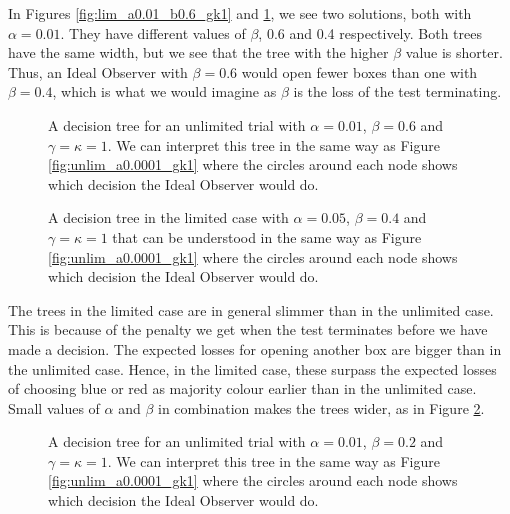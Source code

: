In Figures \ref{fig:lim_a0.01_b0.6_gk1} and \ref{fig:lim_a0.01_b0.4_gk1}, we see two solutions, both with $\alpha=0.01$. They have different values of $\beta$, 0.6 and 0.4 respectively. Both trees have the same width, but we see that the tree with the higher $\beta$ value is shorter. Thus, an Ideal Observer with $\beta=0.6$ would open fewer boxes than one with $\beta=0.4$, which is what we would imagine as $\beta$ is the loss of the test terminating. 
\begin{figure}
    \centering
    \begin{minipage}[t]{0.45\textwidth}
        \centering
        \scalebox{0.6}{}
        \caption[IO solution, limited. $\alpha=0.01$, $\beta=0.6$ and $\gamma=\kappa=1$]{A decision tree for an unlimited trial with $\alpha = 0.01$, $\beta=0.6$ and $\gamma=\kappa=1$.
        We can interpret this tree in the same way as Figure \ref{fig:unlim_a0.0001_gk1} where the circles around each node shows which decision the Ideal Observer would do.}
        \label{fig:lim_a0.01_b0.6_gk1}
    \end{minipage}\hfill
    \begin{minipage}[t]{0.45\textwidth}
        \centering
        \scalebox{0.6}{}
        \caption[IO solution, limited. $\alpha=0.01$, $\beta=0.4$ and $\gamma=\kappa=1$]{A decision tree in the limited case with $\alpha = 0.05$, $\beta=0.4$ and $\gamma=\kappa=1$ that can be understood in the same way as Figure \ref{fig:unlim_a0.0001_gk1} where the circles around each node shows which decision the Ideal Observer would do.}
        \label{fig:lim_a0.01_b0.4_gk1}
    \end{minipage}
\end{figure}


The trees in the limited case are in general slimmer than in the unlimited case. This is because of the penalty we get when the test terminates before we have made a decision. The expected losses for opening another box are bigger than in the unlimited case. Hence, in the limited case, these surpass the expected losses of choosing blue or red as majority colour earlier than in the unlimited case. Small values of $\alpha$ and $\beta$ in combination makes the trees wider, as in Figure \ref{fig:lim_a0.0001_b0.2_gk1}.
\begin{figure}
    \centering
    \scalebox{0.8}{}
    \caption[IO solution, limited. $\alpha=0.0001, \beta=0.2$. $\gamma=\kappa=1$.]{A decision tree for an unlimited trial with $\alpha = 0.01$, $\beta=0.2$ and $\gamma=\kappa=1$.
    We can interpret this tree in the same way as Figure \ref{fig:unlim_a0.0001_gk1} where the circles around each node shows which decision the Ideal Observer would do.}
    \label{fig:lim_a0.0001_b0.2_gk1}
\end{figure}

